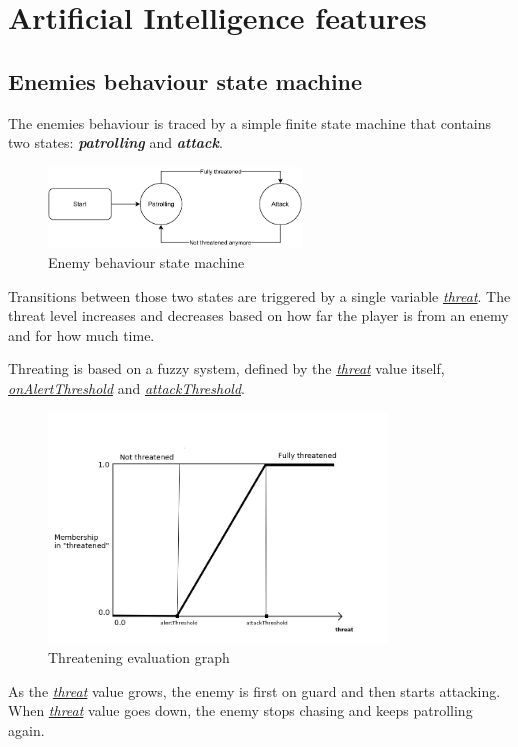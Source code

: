 \documentclass[11pt]{article}
\newcommand{\classname}[1]{\textit{\textbf{#1}}}
\newcommand{\varname}[1]{\underline{\textit{#1}}}
\begin{document}
\section{Artificial Intelligence features}
\subsection{Enemies behaviour state machine}
The enemies behaviour is traced by a simple finite state machine that contains two states: \classname{patrolling} and \classname{attack}.

\begin{figure}[H]
  \centering
  \includegraphics[width=0.6\textwidth]{figures/enemy_behaviour_states}
  \caption{Enemy behaviour state machine}
\end{figure}

Transitions between those two states are triggered by a single variable \varname{threat}. The threat level increases and decreases based on how far the player is from an enemy and for how much time.

Threating is based on a fuzzy system, defined by the \varname{threat} value itself, \varname{onAlertThreshold} and \varname{attackThreshold}.

\begin{figure}[H]
  \centering
  \includegraphics[width=0.8\textwidth]{figures/threat_graph}
  \caption{Threatening evaluation graph}
\end{figure}

As the \varname{threat} value grows, the enemy is first on guard and then starts attacking. When \varname{threat} value goes down, the enemy stops chasing and keeps patrolling again.
\end{document}
